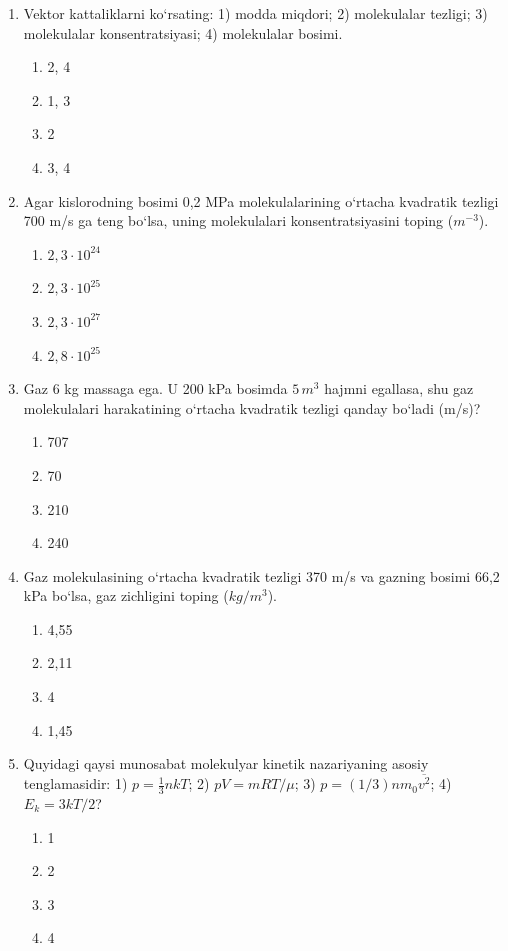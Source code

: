 \begin{enumerate}
\item Vektor kattaliklarni ko‘rsating: 1) modda miqdori; 2) molekulalar tezligi; 3) molekulalar konsentratsiyasi; 4) molekulalar bosimi.
\begin{enumerate}[label=\Alph*)]
\item 2, 4
\item 1, 3
\item 2
\item 3, 4
\end{enumerate}

\item Agar kislorodning bosimi 0,2 MPa molekulalarining o‘rtacha kvadratik tezligi 700 m/s ga teng bo‘lsa, uning molekulalari konsentratsiyasini toping ($m^{-3}$).
\begin{enumerate}[label=\Alph*)]
\item $2,3 \cdot 10^{24}$
\item $2,3 \cdot 10^{25}$
\item $2,3 \cdot 10^{27}$
\item $2,8 \cdot 10^{25}$
\end{enumerate}

\item Gaz 6 kg massaga ega. U 200 kPa bosimda $5 \, m^3$ hajmni egallasa, shu gaz molekulalari harakatining o‘rtacha kvadratik tezligi qanday bo‘ladi (m/s)?
\begin{enumerate}[label=\Alph*)]
\item 707
\item 70
\item 210
\item 240
\end{enumerate}

\item Gaz molekulasining o‘rtacha kvadratik tezligi 370 m/s va gazning bosimi 66,2 kPa bo‘lsa, gaz zichligini toping ($kg/m^3$).
\begin{enumerate}[label=\Alph*)]
\item 4,55
\item 2,11
\item 4
\item 1,45
\end{enumerate}

\item Quyidagi qaysi munosabat molekulyar kinetik nazariyaning asosiy tenglamasidir:
1) $p = \frac{1}{3} n k T$; 2) $pV = mRT/\mu$; 3) $p = (1/3) n m_0 \overline{v^2}$; 4) $E_k = 3kT/2$?
\begin{enumerate}[label=\Alph*)]
\item 1
\item 2
\item 3
\item 4
\end{enumerate}


\end{enumerate}
